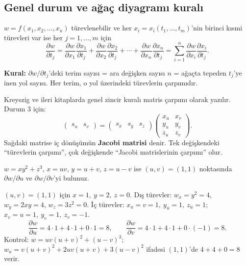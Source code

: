 \subsection{Genel durum ve ağaç diyagramı kuralı}

\begin{teorem}
$w=f(x_1,x_2,\dots,x_n)$ türevlenebilir ve her $x_i=x_i(t_1,\dots,t_m)$'nin birinci kısmi türevleri var ise her
$j=1,\dots,m$ için
\[
\frac{\partial w}{\partial t_j}=\frac{\partial w}{\partial x_1}\frac{\partial x_1}{\partial t_j}
+\frac{\partial w}{\partial x_2}\frac{\partial x_2}{\partial t_j}+\cdots
+\frac{\partial w}{\partial x_n}\frac{\partial x_n}{\partial t_j}
=\sum_{i=1}^{n}\frac{\partial w}{\partial x_i}\frac{\partial x_i}{\partial t_j}.
\]
\end{teorem}

\textbf{Kural:} $\partial w/\partial t_j$'deki terim sayısı = ara değişken sayısı $n$ = ağaçta tepeden $t_j$'ye inen yol
sayısı. Her terim, o yol üzerindeki türevlerin çarpımıdır.

\begin{bilgi}
Kreyszig ve ileri kitaplarda genel zincir kuralı matris çarpımı olarak yazılır. Durum 3 için:
\[
\begin{pmatrix} s_u & s_v \end{pmatrix}
=\begin{pmatrix} s_x & s_y & s_z \end{pmatrix}
\begin{pmatrix} x_u & x_v\\ y_u & y_v\\ z_u & z_v \end{pmatrix}.
\]
Sağdaki matrise iç dönüşümün \textbf{Jacobi matrisi} denir. Tek değişkendeki ``türevlerin çarpımı'', çok değişkende
``Jacobi matrislerinin çarpımı'' olur.
\end{bilgi}

\begin{soru}
$w=xy^2+z^3$, $x=uv$, $y=u+v$, $z=u-v$ ise $(u,v)=(1,1)$ noktasında $\partial w/\partial u$ ve $\partial w/\partial v$'yi bulunuz.
\end{soru}
\begin{cevap}
$(u,v)=(1,1)$ için $x=1,\ y=2,\ z=0$. Dış türevler: $w_x=y^2=4$, $w_y=2xy=4$, $w_z=3z^2=0$.
İç türevler: $x_u=v=1,\ y_u=1,\ z_u=1$; $x_v=u=1,\ y_v=1,\ z_v=-1$.
\[
\frac{\partial w}{\partial u}=4\cdot1+4\cdot1+0\cdot1=\boxed{8},\qquad
\frac{\partial w}{\partial v}=4\cdot1+4\cdot1+0\cdot(-1)=\boxed{8}.
\]
Kontrol: $w=uv(u+v)^2+(u-v)^3$; $w_u=v(u+v)^2+2uv(u+v)+3(u-v)^2$ ifadesi $(1,1)$'de $4+4+0=8$ verir. \checkmark
\end{cevap}

